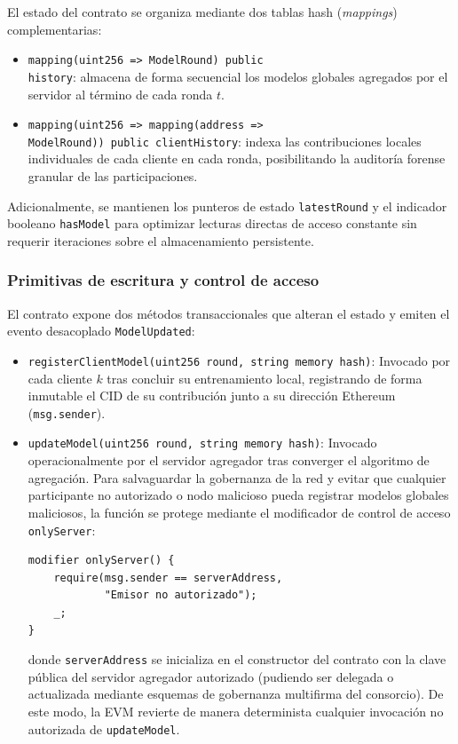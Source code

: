 El estado del contrato se organiza mediante dos tablas hash (\textit{mappings}) complementarias:
\begin{itemize}
    \item \texttt{mapping(uint256 => ModelRound) public \\ history}: almacena de forma secuencial los modelos globales agregados por el servidor al término de cada ronda $t$.
    \item \texttt{mapping(uint256 => mapping(address => \\ ModelRound)) public clientHistory}: indexa las contribuciones locales individuales de cada cliente en cada ronda, posibilitando la auditoría forense granular de las participaciones.
\end{itemize}

Adicionalmente, se mantienen los punteros de estado \texttt{latestRound} y el indicador booleano \texttt{hasModel} para optimizar lecturas directas de acceso constante sin requerir iteraciones sobre el almacenamiento persistente.
\\

\subsubsection{Primitivas de escritura y control de acceso}
El contrato expone dos métodos transaccionales que alteran el estado y emiten el evento desacoplado \texttt{ModelUpdated}:
\begin{itemize}
    \item \texttt{registerClientModel(uint256 round, string memory hash)}: Invocado por cada cliente $k$ tras concluir su entrenamiento local, registrando de forma inmutable el CID de su contribución junto a su dirección Ethereum (\texttt{msg.sender}).
    \item \texttt{updateModel(uint256 round, string memory hash)}: Invocado operacionalmente por el servidor agregador tras converger el algoritmo de agregación. Para salvaguardar la gobernanza de la red y evitar que cualquier participante no autorizado o nodo malicioso pueda registrar modelos globales maliciosos, la función se protege mediante el modificador de control de acceso \texttt{onlyServer}:
    \begin{verbatim}
modifier onlyServer() {
    require(msg.sender == serverAddress, 
            "Emisor no autorizado");
    _;
}
    \end{verbatim}
    donde \texttt{serverAddress} se inicializa en el constructor del contrato con la clave pública del servidor agregador autorizado (pudiendo ser delegada o actualizada mediante esquemas de gobernanza multifirma del consorcio). De este modo, la EVM revierte de manera determinista cualquier invocación no autorizada de \texttt{updateModel}.
\end{itemize}

